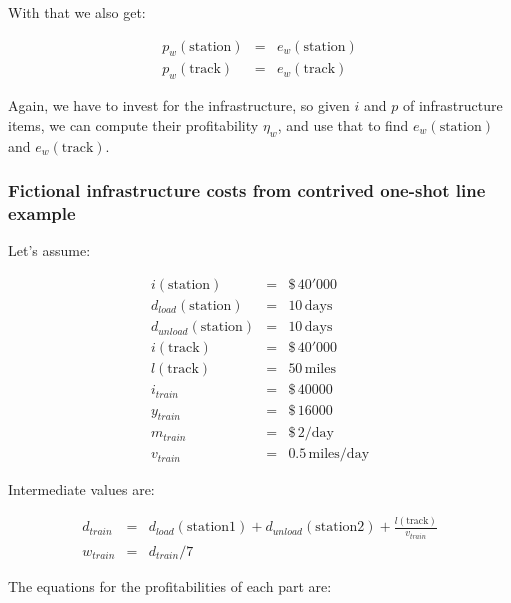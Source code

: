 \documentclass[12pt]{article}
\begin{document}
With that we also get:

\begin{eqnarray}
  p_w\left(\mathrm{station}\right) &=& e_w\left(\mathrm{station}\right) \\
  p_w\left(\mathrm{track}\right)   &=& e_w\left(\mathrm{track}\right)
\end{eqnarray}

Again, we have to invest for the infrastructure, so given $i$ and $p$ of infrastructure items, we can compute their profitability $\eta_w$,
and use that to find $e_w\left(\mathrm{station}\right)$ and $e_w\left(\mathrm{track}\right)$.

\subsubsection{Fictional infrastructure costs from contrived one-shot line example}

Let's assume:

\begin{eqnarray}
i\left(\mathrm{station}\right) &=& \$\, 40'000 \\
d_\mathit{load}\left(\mathrm{station}\right) &=& 10 \,\mathrm{days} \\
d_\mathit{unload}\left(\mathrm{station}\right)  &=& 10 \,\mathrm{days} \\
i\left(\mathrm{track}\right)   &=& \$\, 40'000 \\
l\left(\mathrm{track}\right)   &=& 50 \,\mathrm{miles} \\
i_\mathit{train}   &=& \$\, 40000 \\
y_\mathit{train}   &=& \$\, 16000 \\
m_\mathit{train}   &=& \$\, 2 /\mathrm{day}\\
v_\mathit{train}   &=& 0.5 \,\mathrm{miles}/\mathrm{day}
\end{eqnarray}

Intermediate values are:

\begin{eqnarray}
d_\mathit{train}    &=& d_\mathit{load}\left(\mathrm{station1}\right) + d_\mathit{unload}\left(\mathrm{station2}\right) + \frac{l\left(\mathrm{track}\right)}{v_\mathit{train}} \\
w_\mathit{train}    &=& d_\mathit{train} / 7
\end{eqnarray}


The equations for the profitabilities of each part are:
\end{document}
